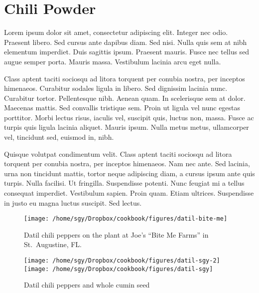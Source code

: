 \documentclass[12pt, final]{book}
\begin{document}
\chapter{Chili Powder}

Lorem ipsum dolor sit amet, consectetur adipiscing elit. Integer nec
odio. Praesent libero. Sed cursus ante dapibus diam. Sed nisi. Nulla
quis sem at nibh elementum imperdiet. Duis sagittis ipsum. Praesent
mauris. Fusce nec tellus sed augue semper porta. Mauris
massa. Vestibulum lacinia arcu eget nulla.

Class aptent taciti sociosqu ad litora torquent per conubia nostra,
per inceptos himenaeos. Curabitur sodales ligula in libero. Sed
dignissim lacinia nunc. Curabitur tortor. Pellentesque nibh. Aenean
quam. In scelerisque sem at dolor. Maecenas mattis. Sed convallis
tristique sem. Proin ut ligula vel nunc egestas porttitor. Morbi
lectus risus, iaculis vel, suscipit quis, luctus non, massa. Fusce ac
turpis quis ligula lacinia aliquet. Mauris ipsum. Nulla metus metus,
ullamcorper vel, tincidunt sed, euismod in, nibh.

Quisque volutpat condimentum velit. Class aptent taciti sociosqu ad
litora torquent per conubia nostra, per inceptos himenaeos. Nam nec
ante. Sed lacinia, urna non tincidunt mattis, tortor neque adipiscing
diam, a cursus ipsum ante quis turpis. Nulla facilisi. Ut
fringilla. Suspendisse potenti. Nunc feugiat mi a tellus consequat
imperdiet. Vestibulum sapien. Proin quam. Etiam ultrices. Suspendisse
in justo eu magna luctus suscipit. Sed lectus.
\clearpage
\begin{figure}
\begin{center}
\texttt{[image: /home/sgy/Dropbox/cookbook/figures/datil-bite-me]}
\end{center}
\caption*{Datil chili peppers on the plant at Joe's ``Bite Me Farms'' in St.\ Augustine, FL.}
\end{figure}

\begin{figure}
\begin{center}
\texttt{[image: /home/sgy/Dropbox/cookbook/figures/datil-sgy-2]}
\texttt{[image: /home/sgy/Dropbox/cookbook/figures/datil-sgy]}
\end{center}
\caption*{Datil chili peppers and whole cumin seed}
\end{figure}

\clearpage

\clearpage

\newpage

\newpage

\newpage

\end{document}
